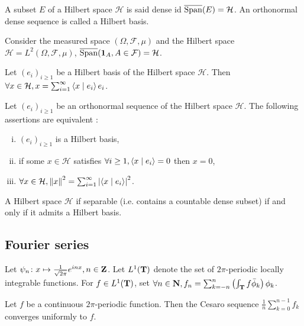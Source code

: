 	\begin{defn}
		A subset $E$ of a Hilbert space $\mathcal{H}$ is said dense id $\overline{\operatorname{Span}}(E) = \mathcal{H}$.
		An orthonormal dense sequence is called a Hilbert basis.
	\end{defn}

	\begin{pop}
		Consider the measured space $(\Omega, \mathcal{F}, \mu)$ and the Hilbert space $\mathcal{H} = L^2(\Omega, \mathcal{F}, \mu)$, $\overline{\operatorname{Span}}(\operatorname{\mathbf{1}}_A, A \in \mathcal{F}) = \mathcal{H}$.
	\end{pop}

	\begin{thm}
		Let $(e_i)_{i \geq 1}$ be a Hilbert basis of the Hilbert space $\mathcal{H}$.
		Then $\forall x \in \mathcal{H}, x = \sum_{i = 1}^\infty \left\langle x \mid e_i \right\rangle e_i$.
	\end{thm}

	\begin{thm}
		Let $(e_i)_{i \geq 1}$ be an orthonormal sequence of the Hilbert space $\mathcal{H}$.
		The following assertions are equivalent :
		\begin{enumerate}[(i)]
			\item $(e_i)_{i \geq 1}$ is a Hilbert basis,
			\item if some $x \in \mathcal{H}$ satisfies $\forall i \geq 1, \left\langle x \mid e_i \right\rangle = 0$ then $x = 0$,
			\item $\forall x \in \mathcal{H}, \left\lVert x\right\rVert^2 = \sum_{i = 1}^\infty \left\lvert\left\langle x \mid e_i \right\rangle\right\rvert^2$.
		\end{enumerate}
	\end{thm}

	\begin{thm}
		A Hilbert space $\mathcal{H}$ if separable (i.e. contains a countable dense subset) if and only if it admits a Hilbert basis.
	\end{thm}


\subsection{Fourier series}

	Let $\psi_n \colon x \mapsto \frac{1}{\sqrt{2\pi}} e^{inx}, n \in \mathbf{Z}$.
	Let $L^1(\mathbf{T})$ denote the set of $2\pi$-periodic locally integrable functions.
	For $f \in L^1(\mathbf{T})$, set $\forall n \in \mathbf{N}, f_n = \sum_{k = -n}^n \left( \int_{\mathbf{T}} f \bar\phi_k \right) \phi_k$.

	\begin{thm}
		Let $f$ be a continuous $2\pi$-periodic function.
		Then the Cesaro sequence $\frac{1}{n} \sum_{k = 0}^{n - 1} f_k$ converges uniformly to $f$.
	\end{thm}

